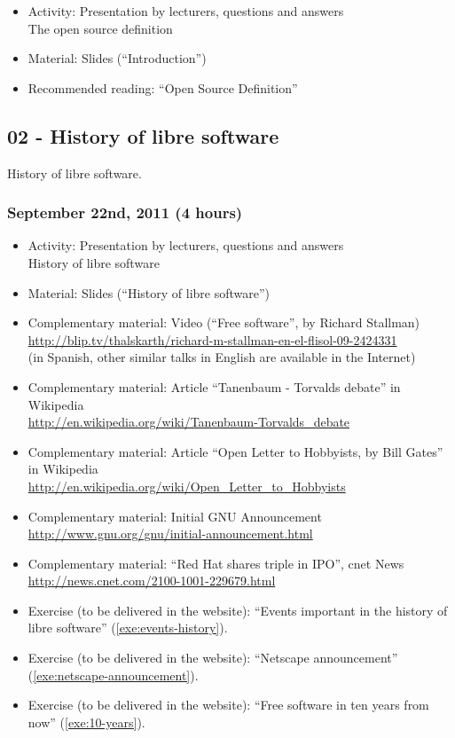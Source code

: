 \documentclass[a4paper]{article}
\begin{document}
\begin{itemize}
\item Activity: Presentation by lecturers, questions and answers \\
  The open source definition
\item Material: Slides (``Introduction'')
\item Recommended reading: ``Open Source Definition''
\end{itemize}

\subsection{02 - History of libre software}

History of libre software.

\subsubsection{September 22nd, 2011 (4 hours)}

\begin{itemize}
\item Activity: Presentation by lecturers, questions and answers \\
  History of libre software
\item Material: Slides (``History of libre software'')
\item Complementary material: Video (``Free software'', by Richard Stallman) \\
  \url{http://blip.tv/thalskarth/richard-m-stallman-en-el-flisol-09-2424331} \\
  (in Spanish, other similar talks in English are available in the Internet)
\item Complementary material: Article ``Tanenbaum - Torvalds debate'' in Wikipedia \\
  \url{http://en.wikipedia.org/wiki/Tanenbaum-Torvalds_debate}
\item Complementary material: Article ``Open Letter to Hobbyists, by Bill Gates'' in Wikipedia \\
\url{http://en.wikipedia.org/wiki/Open_Letter_to_Hobbyists}
\item Complementary material: Initial GNU Announcement \\
  \url{http://www.gnu.org/gnu/initial-announcement.html}
\item Complementary material: ``Red Hat shares triple in IPO'', cnet News \\
  \url{http://news.cnet.com/2100-1001-229679.html}
\item Exercise (to be delivered in the website): ``Events important in the history of libre software'' (\ref{exe:events-history}).
\item Exercise (to be delivered in the website): ``Netscape announcement'' (\ref{exe:netscape-announcement}).
\item Exercise (to be delivered in the website): ``Free software in ten years from now'' (\ref{exe:10-years}).
\end{itemize}
\end{document}
